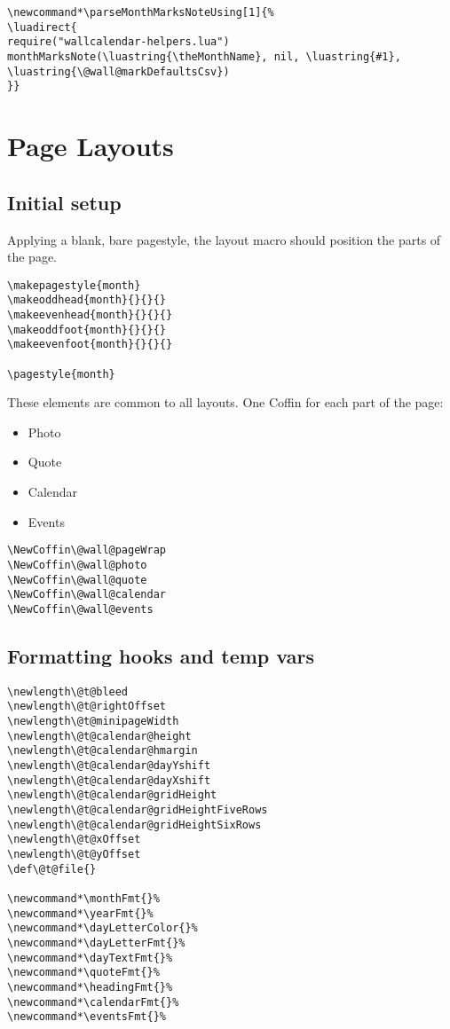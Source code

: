 \documentclass[11pt,oneside]{memoir-article}
\begin{document}
\begin{verbatim}
\newcommand*\parseMonthMarksNoteUsing[1]{%
\luadirect{
require("wallcalendar-helpers.lua")
monthMarksNote(\luastring{\theMonthName}, nil, \luastring{#1}, \luastring{\@wall@markDefaultsCsv})
}}
\end{verbatim}

\chapter{Page Layouts}
\label{sec:orga58446b}
\section{Initial setup}
\label{sec:orgbe4e6d6}

Applying a blank, bare pagestyle, the layout macro should position the parts of
the page.

\begin{verbatim}
\makepagestyle{month}
\makeoddhead{month}{}{}{}
\makeevenhead{month}{}{}{}
\makeoddfoot{month}{}{}{}
\makeevenfoot{month}{}{}{}

\pagestyle{month}
\end{verbatim}

These elements are common to all layouts. One Coffin for each part of the
page:

\begin{itemize}
\item Photo
\item Quote
\item Calendar
\item Events
\end{itemize}

\begin{verbatim}
\NewCoffin\@wall@pageWrap
\NewCoffin\@wall@photo
\NewCoffin\@wall@quote
\NewCoffin\@wall@calendar
\NewCoffin\@wall@events
\end{verbatim}

\section{Formatting hooks and temp vars}
\label{sec:orgab25392}

\begin{verbatim}
\newlength\@t@bleed
\newlength\@t@rightOffset
\newlength\@t@minipageWidth
\newlength\@t@calendar@height
\newlength\@t@calendar@hmargin
\newlength\@t@calendar@dayYshift
\newlength\@t@calendar@dayXshift
\newlength\@t@calendar@gridHeight
\newlength\@t@calendar@gridHeightFiveRows
\newlength\@t@calendar@gridHeightSixRows
\newlength\@t@xOffset
\newlength\@t@yOffset
\def\@t@file{}

\newcommand*\monthFmt{}%
\newcommand*\yearFmt{}%
\newcommand*\dayLetterColor{}%
\newcommand*\dayLetterFmt{}%
\newcommand*\dayTextFmt{}%
\newcommand*\quoteFmt{}%
\newcommand*\headingFmt{}%
\newcommand*\calendarFmt{}%
\newcommand*\eventsFmt{}%
\end{verbatim}
\end{document}
